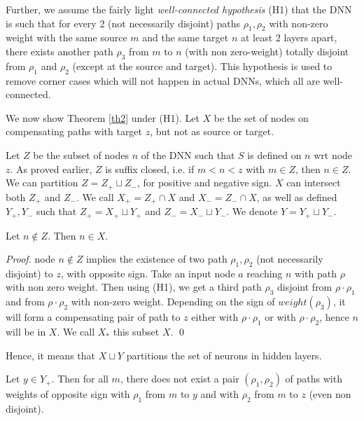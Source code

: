 Further, we assume the fairly light {\em well-connected hypothesis} (H1) that the DNN is such that for every 2 (not necessarily disjoint) paths $\rho_1,\rho_2$ with non-zero weight with the same source $m$ and the same target $n$ at least 2 layers apart, there exists another path $\rho_3$ from $m$ to $n$ (with non zero-weight) totally disjoint from $\rho_1$ and $\rho_2$ (except at the source and target). This hypothesis is used to remove corner cases 
which will not happen in actual DNNs, which all are well-connected.

			\smallskip


			We now show Theorem \ref{th2} under (H1).
			Let $X$ be the set of nodes on compensating paths with target $z$, but not as source or target.
		
			Let $Z$ be the subset of nodes $n$ of the DNN such that $S$ is defined on $n$ 
			wrt node $z$. As proved earlier, $Z$ is suffix closed, i.e. if $m<n<z$ with $m \in Z$, then $n \in Z$. We can partition $Z = Z_{+} \sqcup Z_{-}$, for positive and negative sign. $X$ can intersect both $Z_+$ and $Z_-$.
			We call $X_+ = Z_+ \cap X$ and $X_-=Z_- \cap X$, as well as 
			defined $Y_+,Y_-$ such that $Z_+ = X_+ \sqcup Y_+$ and $Z_- = X_- \sqcup Y_-$.
			We denote $Y=Y_+ \sqcup Y_-$.
			
\begin{lemma}
 Let $n \notin Z$. Then $n \in X$.
\end{lemma}

\begin{proof}
			node $n \notin Z$ implies the existence of two path $\rho_1,\rho_2$ (not necessarily disjoint) to $z$, with opposite sign. 
			Take an input node $a$ reaching $n$ with path $\rho$ with non zero weight.
			Then using (H1), we get a third path $\rho_3$ disjoint from $\rho \cdot \rho_1$ and from $\rho \cdot \rho_2$ with non-zero weight. Depending on the sign of $weight(\rho_3)$, it will form a compensating pair of path to $z$ either with $\rho \cdot \rho_1$ or with $\rho \cdot \rho_2$, hence $n$ will be in $X$. We call $X_*$ this subset $X$. \qed
\end{proof}
			
Hence, it means that $X \sqcup Y$ partitions the set of neurons in hidden layers.
			
\begin{lemma}
	\label{lemma10}
		Let $y \in Y_+$. Then for all $m$, there does not exist a pair $(\rho_1,\rho_2)$ 
		of paths  with weights of opposite sign with $\rho_1$ from $m$ to $y$ and 
		with $\rho_2$ from $m$ to $z$ (even non disjoint).
\end{lemma}

